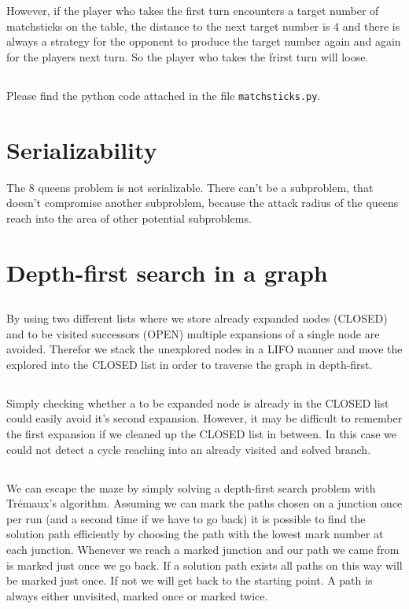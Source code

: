 \documentclass[11pt]{article}
\begin{document}
However, if the player who takes the first turn encounters a target number of matchsticks on the table, the distance to the next target number is 4 and there is always a strategy for the opponent to produce the target number again and again for the players next turn. So the player who takes the frirst turn will loose. 

\subsection{}
Please find the python code attached in the file \texttt{matchsticks.py}.

\section{Serializability}
The 8 queens problem is not serializable. There can't be a subproblem, that doesn't compromise another subproblem, because the attack radius of the queens reach into the area of other potential subproblems.

\section{Depth-first search in a graph}
\subsection{}
By using two different lists where we store already expanded nodes (CLOSED) and to be visited successors (OPEN) multiple expansions of a single node are avoided. Therefor we stack the unexplored nodes in a LIFO manner and move the explored into the CLOSED list in order to traverse the graph in depth-first.


\subsection{}
Simply checking whether a to be expanded node is already in the CLOSED list could easily avoid it's second expansion. However, it may be difficult to remember the first expansion if we cleaned up the CLOSED list in between. In this case we could not detect a cycle reaching into an already visited and solved branch.


\subsection{}
We can escape the maze by simply solving a depth-first search problem with Trémaux's algorithm. Assuming we can mark the paths chosen on a junction once per run (and a second time if we have to go back) it is possible to find the solution path efficiently by choosing the path with the lowest mark number at each junction. Whenever we reach a marked junction and our path we came from is marked just once we go back. If a solution path exists all paths on this way will be marked just once. If not we will get back to the starting point. A path is always either unvisited, marked once or marked twice.
\end{document}
